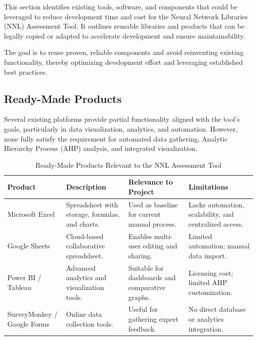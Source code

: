 \documentclass[12pt]{article}
\begin{document}
This section identifies existing tools, software, and components that could be leveraged to reduce development time and cost for the Neural Network Libraries (NNL) Assessment Tool. It outlines reusable libraries and products that can be legally copied or adapted to accelerate development and ensure maintainability.

The goal is to reuse proven, reliable components and avoid reinventing existing functionality, thereby optimizing development effort and leveraging established best practices.

\subsection{Ready-Made Products}

Several existing platforms provide partial functionality aligned with the tool’s goals, particularly in data visualization, analytics, and automation. However, none fully satisfy the requirement for automated data gathering, Analytic Hierarchy Process (AHP) analysis, and integrated visualization.

\begin{table}[H]
\centering
\caption{Ready-Made Products Relevant to the NNL Assessment Tool}
\setlength{\tabcolsep}{4pt}
\renewcommand{\arraystretch}{1.2}
\footnotesize

\begin{tabularx}{\textwidth}{p{3cm} Y Y Y}
\toprule
\textbf{Product} & \textbf{Description} & \textbf{Relevance to Project} & \textbf{Limitations} \\
\midrule
Microsoft Excel &
Spreadsheet with storage, formulas, and charts. &
Used as baseline for current manual process. &
Lacks automation, scalability, and centralized access. \\
\hline
Google Sheets &
Cloud-based collaborative spreadsheet. &
Enables multi-user editing and sharing. &
Limited automation; manual data import. \\
\hline
Power BI / Tableau &
Advanced analytics and visualization tools. &
Suitable for dashboards and comparative graphs. &
Licensing cost; limited AHP customization. \\
\hline
SurveyMonkey / Google Forms &
Online data collection tools. &
Useful for gathering expert feedback. &
No direct database or analytics integration. \\
\bottomrule
\end{tabularx}
\end{table}
\end{document}
